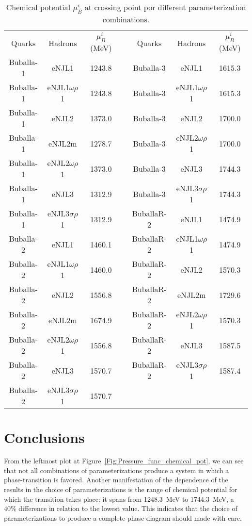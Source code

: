 \documentclass{ws-ijmpcs}
\begin{document}
\begin{table}
\centering
\caption{Chemical potential $\mu_B^i$ at crossing point por different parameterization combinations. \label{Tab:Transition_chemical_pot}}
\begin{tabular}{ccccccc}
\toprule
Quarks & Hadrons & $\mu_B^i$ (MeV) &\phantom{~o~}& Quarks & Hadrons & $\mu_B^i$ (MeV)\\
\cmidrule{1-3} \cmidrule{5-7}
Buballa-1 & eNJL1 & 1243.8 && Buballa-3 & eNJL1 & 1615.3 \\
Buballa-1 & eNJL1$\omega\rho$1 & 1243.8 && Buballa-3 & eNJL1$\omega\rho$1 & 1615.3 \\
Buballa-1 & eNJL2 & 1373.0 && Buballa-3 & eNJL2 & 1700.0 \\
Buballa-1 & eNJL2m & 1278.7 && Buballa-3 & eNJL2$\omega\rho$1 & 1700.0 \\
Buballa-1 & eNJL2$\omega\rho$1 & 1373.0 && Buballa-3 & eNJL3 & 1744.3 \\
Buballa-1 & eNJL3 & 1312.9 && Buballa-3 & eNJL3$\sigma\rho$1 & 1744.3 \\
Buballa-1 & eNJL3$\sigma\rho$1 & 1312.9 && BuballaR-2 & eNJL1 & 1474.9 \\
Buballa-2 & eNJL1 & 1460.1 && BuballaR-2 & eNJL1$\omega\rho$1 & 1474.9 \\
Buballa-2 & eNJL1$\omega\rho$1 & 1460.0 && BuballaR-2 & eNJL2 & 1570.3 \\
Buballa-2 & eNJL2 & 1556.8 && BuballaR-2 & eNJL2m & 1729.6 \\
Buballa-2 & eNJL2m & 1674.9 && BuballaR-2 & eNJL2$\omega\rho$1 & 1570.3 \\
Buballa-2 & eNJL2$\omega\rho$1 & 1556.8 && BuballaR-2 & eNJL3 & 1587.5 \\
Buballa-2 & eNJL3 & 1570.7 && BuballaR-2 & eNJL3$\sigma\rho$1 & 1587.4 \\
Buballa-2 & eNJL3$\sigma\rho$1 & 1570.7 \\

\bottomrule
\end{tabular}
\end{table}


\section{Conclusions}

From the leftmost plot at Figure~\ref{Fig:Pressure_func_chemical_pot}, we can see that not all combinations of parameterizations produce a system in which a phase-transition is favored. Another manifestation of the dependence of the results in the choice of parameterizations is the range of chemical potential for which the transition takes place: it spans from 1248.3~MeV to 1744.3~MeV, a 40\% difference in relation to the lowest value. This indicates that the choice of parameterizations to produce a complete phase-diagram should made with care.
\end{document}
